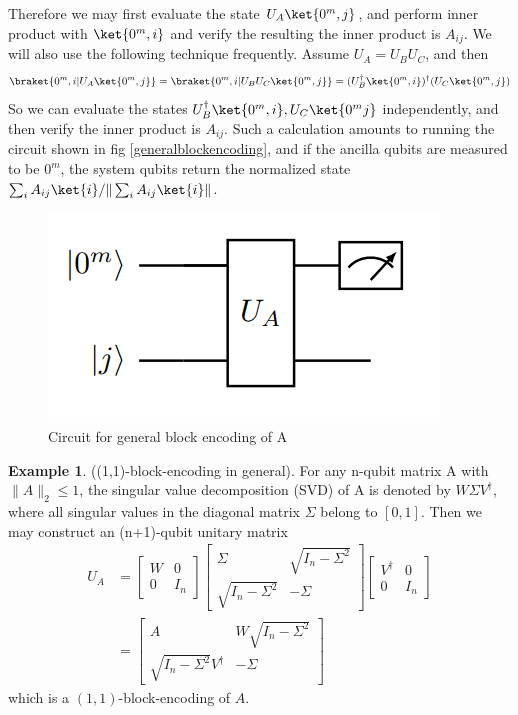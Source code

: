 \documentclass[12pt, oneside]{book}
\theoremstyle{definition}
\theoremstyle{definition}
\newtheorem{example}{Example}[section]
\theoremstyle{remark}
\begin{document}
Therefore we may first evaluate the state $U_A\ket{0^m,j}$, and perform inner product with $\ket{0^m,i}$ and verify the resulting the inner product is $A_{ij}$. We will also use the following technique frequently. Assume $U_A=U_BU_C$, and then
\[
\braket{0^m,i|U_A\ket{0^m,j}}=\braket{0^m,i|U_BU_C\ket{0^m,j}}=(U^{\dagger}_B\ket{0^m,i})^{\dagger}(U_C\ket{0^m,j})
\]
So we can evaluate the states $U^{\dagger}_B\ket{0^m,i},U_C\ket{0^mj}$ independently, and then verify the inner product is $A_{ij}$. Such a calculation amounts to running the circuit shown in fig \ref{generalblockencoding}, and if the ancilla qubits are measured to be $0^m$, the system qubits return the normalized state $\sum_iA_{ij}\ket{i}/\|\sum_iA_{ij}\ket{i}\|$.
\begin{figure}
    \centering
    \includegraphics[width=1\linewidth]{../images/generalblockencoding.png}
    \caption{Circuit for general block encoding of A}
    \label{fig:generalblockencoding}
\end{figure}
\begin{example}
    ((1,1)-block-encoding in general). For any n-qubit matrix A with $\|A\|_2\leq 1$, the singular value decomposition (SVD) of A is denoted by $W\Sigma V^{\dagger}$, where all singular values in the diagonal matrix $\Sigma$ belong to $[0,1]$. Then we may construct an (n+1)-qubit unitary matrix
    \begin{align*}
    U_A&=\begin{bmatrix} W & 0 \\ 0 & I_n\end{bmatrix} \begin{bmatrix}\Sigma & \sqrt{I_n-\Sigma^2} \\ \sqrt{I_n-\Sigma^2} & -\Sigma \end{bmatrix} \begin{bmatrix} V^{\dagger} & 0 \\ 0 & I_n\end{bmatrix}\\
    &=\begin{bmatrix} A & W\sqrt{I_n-\Sigma^2} \\ \sqrt{I_n-\Sigma^2}V^{\dagger} & -\Sigma \end{bmatrix}
    \end{align*}
    which is a $(1,1)$-block-encoding of $A$.
\end{example}
\end{document}
